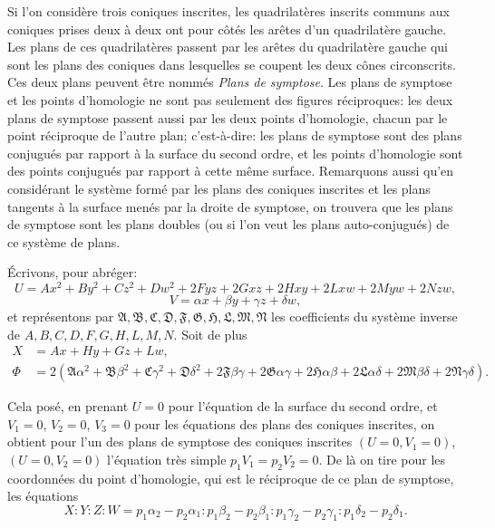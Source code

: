 \documentclass[12pt,a4paper]{article}
\theoremstyle{definition}
\begin{document}
Si l'on consid\`{e}re trois coniques inscrites, les quadrilat\`{e}res inscrits communs aux coniques prises deux \`{a} deux ont pour c\^{o}t\'{e}s les ar\^{e}tes d'un quadrilat\`{e}re gauche. Les plans de ces quadrilat\`{e}res passent par les ar\^{e}tes du quadrilat\`{e}re gauche qui sont les plans des coniques dans lesquelles se coupent les deux c\^{o}nes circonscrits. Ces deux plans peuvent \^{e}tre nomm\'{e}s \emph{Plans de symptose}. Les plans de symptose et les points d'homologie ne sont pas seulement des figures r\'{e}ciproques: les deux plans de symptose passent aussi par les deux points d'homologie, chacun par le point r\'{e}ciproque de l'autre plan; c'est-\`{a}-dire: les plans de symptose sont des plans conjugu\'{e}s par rapport \`{a} la surface du second ordre, et les points d'homologie sont des points conjugu\'{e}s par rapport \`{a} cette m\^{e}me surface. Remarquons aussi qu'en consid\'{e}rant le syst\`{e}me form\'{e} par les plans des coniques inscrites et les plans tangents \`{a} la surface men\'{e}s par la droite de symptose, on trouvera que les plans de symptose sont les plans doubles (ou si l'on veut les plans auto-conjugu\'{e}s) de ce syst\`{e}me de plans.


\'{E}crivons, pour abr\'{e}ger:
\[
U = Ax^2 + By^2 + Cz^2 + Dw^2 + 2Fyz + 2Gxz + 2Hxy + 2Lxw + 2Myw + 2Nzw,
\]
\[
V = \alpha x + \beta y + \gamma z + \delta w,
\]
et repr\'{e}sentons par $\mathfrak{A}, \mathfrak{B}, \mathfrak{C}, \mathfrak{D}, \mathfrak{F}, \mathfrak{G}, \mathfrak{H}, \mathfrak{L}, \mathfrak{M}, \mathfrak{N}$ les coefficients du syst\`{e}me inverse de $A, B, C, D, F, G, H, L, M, N$. Soit de plus
\begin{align*}
X &= Ax + Hy + Gz + Lw, \\
\Phi &= 2(\mathfrak{A}\alpha^2 + \mathfrak{B}\beta^2 + \mathfrak{C}\gamma^2 + \mathfrak{D}\delta^2 + 2\mathfrak{F}\beta\gamma + 2\mathfrak{G}\alpha\gamma + 2\mathfrak{H}\alpha\beta + 2\mathfrak{L}\alpha\delta + 2\mathfrak{M}\beta\delta + 2\mathfrak{N}\gamma\delta).
\end{align*}

Cela pos\'{e}, en prenant $U = 0$ pour l'\'{e}quation de la surface du second ordre, et $V_1 = 0$, $V_2 = 0$, $V_3 = 0$ pour les \'{e}quations des plans des coniques inscrites, on obtient pour l'un des plans de symptose des coniques inscrites $(U = 0, V_1 = 0)$, $(U = 0, V_2 = 0)$ l'\'{e}quation tr\`{e}s simple $p_1 V_1 = p_2 V_2 = 0$. De l\`{a} on tire pour les coordonn\'{e}es du point d'homologie, qui est le r\'{e}ciproque de ce plan de symptose, les \'{e}quations
\[
X : Y : Z : W = p_1 \alpha_2 - p_2 \alpha_1 : p_1 \beta_2 - p_2 \beta_1 : p_1 \gamma_2 - p_2 \gamma_1 : p_1 \delta_2 - p_2 \delta_1.
\]
\end{document}
